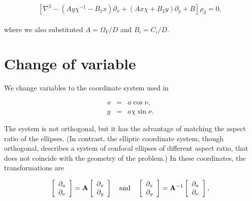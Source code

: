 \documentclass[apj]{emulateapj}
\newcommand{\pderiv}[2]{\frac{\partial #1}{\partial #2}}
\newcommand{\pderivn}[3]{\frac{\partial^{#3} #1}{\partial #2^{#3}}}
\newcommand{\vt}[1]{\mathbf{#1}}       %
\renewcommand{\v}[1]{{\boldsymbol{#1}}} %
\newcommand{\Laplace}{\nabla^2}
\newcommand{\beq}{\begin{equation}}
\newcommand{\eeq}{\end{equation}}
\newcommand{\beqn}{\begin{eqnarray}}
\newcommand{\eeqn}{\end{eqnarray}}
\begin{document}


\beq
\left[\Laplace{} - \left(Ay\chi^{-1} - B_1x\right) \partial_x  +
  \left(A x \chi + B_2y\right) \partial_y + B \right] \rho_d   = 0,  
\label{eq:dust-trapping-cartesian}
\eeq
\\
\noindent where we also substituted  $A=\varOmega_V/D$ and $B_i=C_i/D$.

\section{Change of variable}

We change variables to the coordinate system used in \citet{Chang-Oishi10}

\beqn
  x &=& a \cos\nu, \label{eq:change-x}\\
  y &=& a\chi\sin\nu.  \label{eq:change-y}
\eeqn

The system is not orthogonal, but it has the advantage of matching the
aspect ratio of the ellipses. (In contrast, the elliptic coordinate
system, though orthogonal, describes a system of confocal ellipses of
different aspect ratio, that does not coincide with the geometry of
the problem.) In these coordinates, the transformations are 


\beq
\left[\begin{array}{c}
    \partial_{a}  \\
    \partial_{\nu}
  \end{array}\right] = \vt{A} 
  \left[\begin{array}{c}
      \partial_{x}  \\
      \partial_{y}
    \end{array}\right] 
%
\quad {\rm and} \quad 
%
\left[\begin{array}{c}
    \partial_{x}  \\
    \partial_{y}
  \end{array}\right] = \vt{A}^{-1} 
  \left[\begin{array}{c}
      \partial_{a}  \\
      \partial_{\nu}
    \end{array}\right],  
%
\eeq
\end{document}
